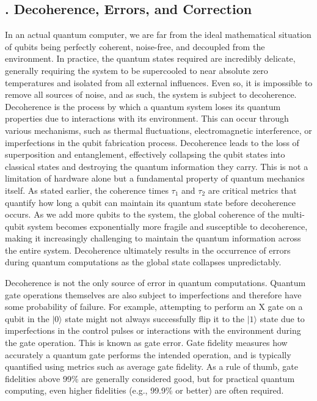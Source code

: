 \documentclass{elbioimp2}
\begin{document}
\subsection{. Decoherence, Errors, and Correction}
In an actual quantum computer, we are far from the ideal mathematical situation of qubits being perfectly coherent, noise-free, and decoupled from the environment. In practice, the quantum states required are incredibly delicate, generally requiring the system to be supercooled to near absolute zero temperatures and isolated from all external influences. Even so, it is impossible to remove all sources of noise, and as such, the system is subject to decoherence. Decoherence is the process by which a quantum system loses its quantum properties due to interactions with its environment. This can occur through various mechanisms, such as thermal fluctuations, electromagnetic interference, or imperfections in the qubit fabrication process. Decoherence leads to the loss of superposition and entanglement, effectively collapsing the qubit states into classical states and destroying the quantum information they carry. This is not a limitation of hardware alone but a fundamental property of quantum mechanics itself. As stated earlier, the coherence times $\tau_1$ and $\tau_2$ are critical metrics that quantify how long a qubit can maintain its quantum state before decoherence occurs. As we add more qubits to the system, the global coherence of the multi-qubit system becomes exponentially more fragile and susceptible to decoherence, making it increasingly challenging to maintain the quantum information across the entire system. Decoherence ultimately results in the occurrence of errors during quantum computations as the global state collapses unpredictably.

Decoherence is not the only source of error in quantum computations. Quantum gate operations themselves are also subject to imperfections and therefore have some probability of failure. For example, attempting to perform an X gate on a qubit in the $|0\rangle$ state might not always successfully flip it to the $|1\rangle$ state due to imperfections in the control pulses or interactions with the environment during the gate operation. This is known as gate error. Gate fidelity measures how accurately a quantum gate performs the intended operation, and is typically quantified using metrics such as average gate fidelity. As a rule of thumb, gate fidelities above 99\% are generally considered good, but for practical quantum computing, even higher fidelities (e.g., 99.9\% or better) are often required.
\end{document}
